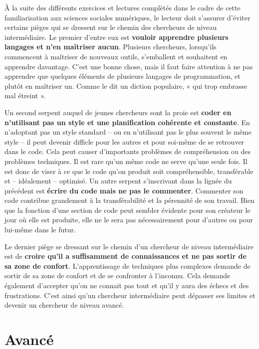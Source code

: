 \documentclass[
  letterpaper,
]{scrbook}
\begin{document}
À la suite des différents exercices et lectures complètés dans le cadre
de cette familiarisation aux sciences sociales numériques, le lecteur
doit s'assurer d'éviter certains pièges qui se dressent sur le chemin
des chercheurs de niveau intermédiaire. Le premier d'entre eux est
\textbf{vouloir apprendre plusieurs langages et n'en maîtriser aucun}.
Plusieurs chercheurs, lorsqu'ils commencent à maîtriser de nouveaux
outils, s'emballent et souhaitent en apprendre davantage. C'est une
bonne chose, mais il faut faire attention à ne pas apprendre que
quelques éléments de plusieurs langages de programmation, et plutôt en
maîtriser un. Comme le dit un diction populaire, « qui trop embrasse mal
étreint ».

Un second serpent auquel de jeunes chercheurs sont la proie est
\textbf{coder en n'utilisant pas un style et une planification cohérente
et constante}. En n'adoptant pas un style standard -- ou en n'utilisant
pas le plus souvent le même style -- il peut devenir difficle pour les
autres et pour soi-même de se retrouver dans le code. Cela peut causer
d'importants problèmes de compréhension ou des problèmes techniques. Il
est rare qu'un même code ne serve qu'une seule fois. Il est donc de
viser à ce que le code qu'on produit soit compréhensible, transférable
et -- idéalement -- optimisé. Un autre serpent s'inscrivant dans la
lignée du précédent est \textbf{écrire du code mais ne pas le
commenter}. Commenter son code contribue grandement à la transférabilité
et la pérennité de son travail. Bien que la fonction d'une section de
code peut sembler évidente pour son créateur le jour où elle est
produite, elle ne le sera pas nécessairement pour d'autres ou pour
lui-même dans le futur.

Le dernier piège se dressant sur le chemin d'un chercheur de niveau
intermédiaire est de \textbf{croire qu'il a suffisamment de
connaissances et ne pas sortir de sa zone de confort}. L'apprentissage
de techniques plus complexes demande de sortir de sa zone de confort et
de se confronter à l'inconnu. Cela demande également d'accepter qu'on ne
connait pas tout et qu'il y aura des échecs et des frustrations. C'est
ainsi qu'un chercheur intermédiaire peut dépasser ses limites et devenir
un chercheur de niveau avancé.

\hypertarget{avancuxe9}{%
\section{Avancé}\label{avancuxe9}}
\end{document}
